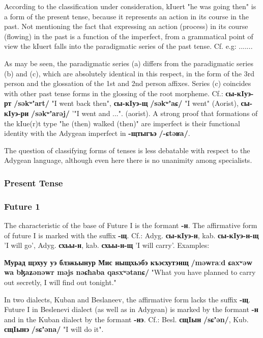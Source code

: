 \documentclass[a4paper,12pt]{book}
\newcommand{\1}[1]{\textbf{\emph{#1}}} %
\newcommand{\2}[1]{\textbf{[#1]}} %
\newcommand{\3}[1]{\fontsize{11pt}{0cm}\textbf{\emph{#1}}} %
\newcommand{\4}[1]{\fontsize{10pt}{0cm}\emph{#1}}	%
\newcommand{\5}[1]{\textbf{/#1/}} %
\newcommand{\6}[1]{\textbf{[#1]}} %
\newcommand{\7}[1]{\fontsize{12pt}{0cm}\emph{#1}} %
\newcommand{\8}[1]{\fontsize{12pt}{0cm}`#1'} %
\newcommand{\9}[1]{\fontsize{12pt}{0cm}(lit. `#1')} %
\newcommand{\glossphonemics}[1]{\textbf{/#1/}} %
\begin{document}
According to the classification under consideration, kIuert "he was going then" is a form of the present tense, because it represents an action in its course in the past. Not mentioning the fact that expressing an action (process) in its course (flowing) in the past is a function of the imperfect, from a grammatical point of view the kIuert falls into the paradigmatic series of the past tense. Cf. e.g:
.......

As may be seen, the paradigmatic series (a) differs from the paradigmatic series (b) and (c), which are absolutely identical in this respect, in the form of the 3rd person and the glossation of the 1st and 2nd person affixes. Series (c) coincides with other past tense forms in the glossing of the root morpheme. Cf.: \textbf{сы-кIуэ-рт} \glossphonemics{səkʷʼart} "I went back then", \textbf{сы-кIуэ-щ} \glossphonemics{səkʷʼaɕ} "I went" (Aorist), \textbf{сы-кIуэ-ри} \glossphonemics{səkʷʼarəj} '"I went and ...". (aorist). A strong proof that formations of the kIue(r)t type "he (then) walked (then)" are imperfect is their functional identity with the Adygean imperfect in \textbf{-щтыгъэ} \glossphonemics{-ɕtəʁa}.

The question of classifying forms of tenses is less debatable with respect to the Adygean language, although even here there is no unanimity among specialists.
\subsubsection{Present Tense}
\subsubsection{Future 1}
The characteristic of the base of Future I is the formant \textbf{-н}. The affirmative form of future I is marked with the suffix \textbf{-щ}. Cf.: Adyg. \textbf{сы-кIуэ-н}, kab. \textbf{сы-кIуэ-н-щ} 'I will go', Adyg. \textbf{схьы-н}, kab. \textbf{схьы-н-щ} 'I will carry'. Examples:

\textbf{Мурад щэхуу уэ блэжьынур Мис ныщхьэбэ къэсхутэнщ} \glossphonemics{məwraːd ɕaxʷəw wa bɮaʑənəwr məjs nəɕħaba qasxʷətanɕ} "What you have planned to carry out secretly, I will find out tonight."

In two dialects, Kuban and Beslaneev, the affirmative form lacks the suffix \textbf{-щ}. Future I in Beslenevi dialect (as well as in Adygean) is marked by the formant \textbf{-н} and in the Kuban dialect by the formant \textbf{-нэ}. Cf.: Besl. \textbf{сщIын} \glossphonemics{sɕʼən}, Kub. \textbf{сщIынэ} \glossphonemics{sɕʼəna} "I will do it".
\end{document}
